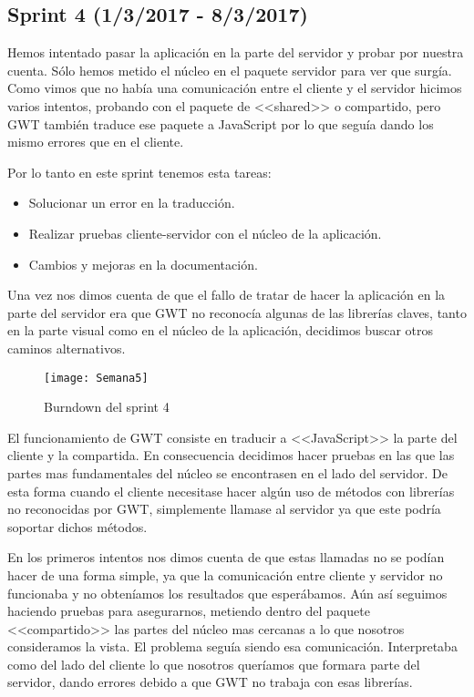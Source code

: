 \subsection{Sprint 4 (1/3/2017 - 8/3/2017)}
Hemos intentado pasar la aplicación en la parte del servidor y probar por nuestra cuenta. Sólo hemos metido el núcleo en el paquete servidor para ver que surgía. Como vimos que no había una comunicación entre el cliente y el servidor hicimos varios intentos, probando con el paquete de <<shared>> o compartido, pero GWT también traduce ese paquete a JavaScript por lo que seguía dando los mismo errores que en el cliente.

Por lo tanto en este sprint tenemos esta tareas:

\begin{itemize}
\item Solucionar un error en la traducción.
\item Realizar pruebas cliente-servidor con el núcleo de la aplicación.
\item Cambios y mejoras en la documentación.
\end{itemize}

Una vez nos dimos cuenta de que el fallo de tratar de hacer la aplicación en la parte del servidor era que GWT no reconocía algunas de las librerías claves, tanto en la parte visual como en el núcleo de la aplicación, decidimos buscar otros caminos alternativos. 


\begin{figure}[h]
\centering
\texttt{[image: Semana5]}
\caption{Burndown del sprint 4}
\label{fig:A.3}
\end{figure}

El funcionamiento de GWT consiste en traducir a <<JavaScript>> la parte del cliente y la compartida. En consecuencia decidimos hacer pruebas en las que las partes mas fundamentales del núcleo se encontrasen en el lado del servidor. De esta forma cuando el cliente necesitase hacer algún uso de métodos con librerías no reconocidas por GWT, simplemente llamase al servidor ya que este podría soportar dichos métodos. 

En los primeros intentos nos dimos cuenta de que estas llamadas no se podían hacer de una forma simple, ya que la comunicación entre cliente y servidor no funcionaba y no obteníamos los resultados que esperábamos. Aún así seguimos haciendo pruebas para asegurarnos, metiendo dentro del paquete <<compartido>> las partes del núcleo mas cercanas a lo que nosotros consideramos la vista. El problema seguía siendo esa comunicación. Interpretaba como del lado del cliente lo que nosotros queríamos que formara parte del servidor, dando errores debido a que GWT no trabaja con esas librerías.

